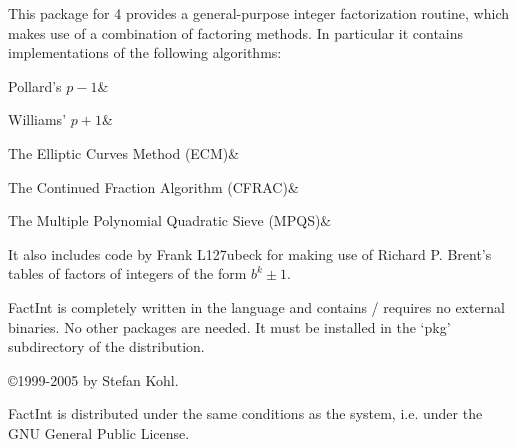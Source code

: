 
This package for {\GAP} 4 provides a general-purpose integer
factorization routine, which makes use of a combination of factoring
methods. In particular it contains implementations of the following
algorithms:

\beginitems
Pollard's $p-1$&

Williams' $p+1$&

The Elliptic Curves Method (ECM)&

The Continued Fraction Algorithm (CFRAC)&

The Multiple Polynomial Quadratic Sieve (MPQS)&
\enditems

It also includes code by Frank L\accent127ubeck for making use of
Richard P. Brent's tables of factors of integers of the form $b^k \pm 1$.

{\sf FactInt} is completely written in the {\GAP} language and contains /
requires no external binaries. No other packages are needed.
It must be installed in the `pkg' subdirectory of the
{\GAP} distribution.

\vfill

\copyright 1999-2005 by Stefan Kohl.

{\sf FactInt} is distributed under the same conditions as the {\GAP}
system, i.e. under the GNU General Public License.

